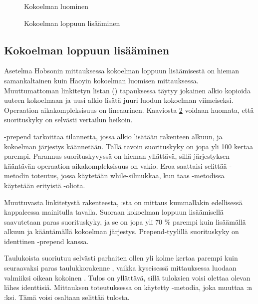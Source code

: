 \begin{figure}[h]
    \centering
    
    \caption{Kokoelman luominen}\label{kokoelmanLuominen_kaavio}
\end{figure}


\begin{figure}[h]
    \centering
    
    \caption{Kokoelman loppuun lisääminen}\label{kokoelmanLoppuunLisaaminen_kaavio}
\end{figure}

\subsection{Kokoelman loppuun lisääminen}
Asetelma Hobsonin mittauksessa\cite{hobsonBenchmark} kokoelman loppuun lisäämisestä on hieman samankaltainen kuin Haoyin\cite{haoyiBenchmark} kokoelman luomisen mittauksessa. Muuttumattoman linkitetyn listan () tapauksessa täytyy jokainen alkio kopioida uuteen kokoelmaan ja uusi alkio lisätä juuri luodun kokoelman viimeiseksi. Operaation aikakompleksisuus on lineaarinen. Kaaviosta \ref{kokoelmanLoppuunLisaaminen_kaavio} voidaan huomata, että suorituskyky on selvästi vertailun heikoin.

-prepend tarkoittaa tilannetta, jossa alkio lisätään rakenteen alkuun, ja kokoelman järjestys käännetään. Tällä tavoin suorituskyky on jopa yli 100 kertaa parempi. Parannus suorituskyvyssä on hieman yllättävä, sillä järjestyksen kääntävän operaation aikakompleksisuus on vakio. Eroa saattaisi selittää -metodin toteutus, jossa käytetään while-silmukkaa, kun taas \code{:+}-metodissa käytetään erityistä -oliota.

Muuttuvasta linkitetystä rakenteesta, :sta on mittaus kummallakin edellisessä kappaleessa mainitulla tavalla. Suoraan kokoelman loppuun lisäämisellä saavutetaan paras suorituskyky, ja se on jopa yli 70 \% parempi kuin lisäämällä alkuun ja kääntämällä kokoelman järjestys. Prepend-tyylillä suorituskyky on identtinen -prepend kanssa. 

Taulukoista  suoriutuu selvästi parhaiten ollen yli kolme kertaa parempi kuin seuraavaksi paras taulukkorakenne , vaikka kyseisessä mittauksessa luodaan valmiiksi oikean kokoinen . Tulos on yllättävä, sillä tuloksien voisi olettaa olevan lähes identtisiä. Mittauksen \cite{hobsonBenchmark} toteutuksessa on käytetty -metodia, joka muuttaa :n :ksi. Tämä voisi osaltaan selittää tulosta.

